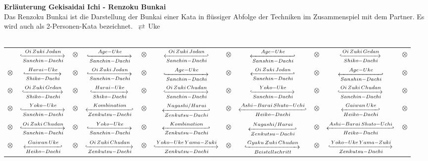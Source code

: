 		{\textbf{Erläuterung Gekisaidai Ichi - Renzoku Bunkai}}\\
		Das Renzoku Bunkai ist die Darstellung der Bunkai einer Kata in flüssiger Abfolge der Techniken im Zusammenspiel mit dem Partner. Es wird auch als 2-Personen-Kata bezeichnet. \,\(\rightleftarrows\)\,{\color{Blue}Uke}\\\\
\setlength{\tabcolsep}{1pt}
\begin{tabular}{*{11}{c}}
	&{\color{GKD}$\xhookrightarrow[Sanchin-Dachi]{Oi\,Zuki\,Jodan}$}
	&$\otimes$
	&{\color{Blue}$\xhookrightarrow[Sanchin-Dachi]{Age-Uke}$}
	&$\otimes$
	&{\color{Blue}$\xhookleftarrow[Sanchin-Dachi]{Oi\,Zuki\,Jodan}$}
	&$\otimes$
	&{\color{GKD}$\xhookleftarrow[Sanshin-Dachi]{Age-Uke}$}
	&$\otimes$
	&{\color{GKD}$\xhookrightarrow[Shiko-Dachi]{Oi\,Zuki\,Gedan}$}
	&$\otimes$\\
	\addlinespace[8pt]
	$\otimes$
	&{\color{Blue}$\xhookrightarrow[Shiko-Dachi]{Harai-Uke}$}
	&$\otimes$
	&{\color{GKD}$\xhookrightarrow[Sanchin-Dachi]{Oi\,Zuki\,Jodan}$}
	&$\otimes$
	&{\color{Blue}$\xhookrightarrow[Sanchin-Dachi]{Age-Uke}$}
	&$\otimes$
	&{\color{Blue}$\xhookleftarrow[Sanchin-Dachi]{Oi\,Zuki\,Jodan}$}
	&$\otimes$
	&{\color{GKD}$\xhookleftarrow[Sanshin-Dachi]{Age-Uke}$}
	&$\otimes$\\
	\addlinespace[8pt]
	$\otimes$
	&{\color{GKD}$\xhookrightarrow[Shiko-Dachi]{Oi\,Zuki\,Gedan}$}
	&$\otimes$
	&{\color{Blue}$\xhookrightarrow[Shiko-Dachi]{Harai-Uke}$}
	&$\otimes$
	&{\color{GKD}$\xhookrightarrow[Sanchin-Dachi]{Oi\,Zuki\,Chudan}$}
	&$\otimes$
	&{\color{Blue}$\xhookrightarrow[Sanchin-Dachi]{Yoko-Uke}$}
	&$\otimes$
	&{\color{GKD}$\xhookrightarrow[Sanchin-Dachi]{Oi\,Zuki\,Chudan}$}
	&$\otimes$\\
	\addlinespace[8pt]
	$\otimes$
	&{\color{Blue}$\xhookrightarrow[Sanchin-Dachi]{Yoko-Uke}$}
	&$\otimes$
	&{\color{Blue}$\xhookleftarrow[Zenkutsu-Dachi]{Kombination}$}
	&$\otimes$
	&{\color{GKD}$\xhookleftarrow[Zenkutsu-Dachi]{Nagashi/Harai}$}
	&$\otimes$
	&{\color{Blue}$\xhookleftarrow[Heiko-Dachi]{Ashi-Barai\,Shuto-Uchi}$}
	&$\otimes$
	&{\color{GKD}$\xhookleftarrow[Heiko-Dachi]{Gaiwan\,Uke}$}
	&$\otimes$\\
	\addlinespace[8pt]
	$\otimes$
	&{\color{GKD}$\xhookrightarrow[Sanchin-Dachi]{Oi\,Zuki\,Chudan}$}
	&$\otimes$
	&{\color{Blue}$\xhookrightarrow[Sanchin-Dachi]{Yoko-Uke}$}
	&$\otimes$
	&{\color{Blue}$\xhookleftarrow[Zenkutsu-Dachi]{Kombination}$}
	&$\otimes$
	&{\color{GKD}$\xhookleftarrow[Zenkutsu-Dachi]{Nagashi/Harai}$}
	&$\otimes$
	&{\color{Blue}$\xhookleftarrow[Heiko-Dachi]{Ashi-Barai\,Shuto-Uchi}$}
	&$\otimes$\\
	\addlinespace[8pt]
	$\otimes$
	&{\color{GKD}$\xhookleftarrow[Heiko-Dachi]{Gaiwan\,Uke}$}
	&$\otimes$
	&{\color{GKD}$\xhookrightarrow[Zenkutsu-Dachi]{Oi\,Zuki\,Chudan}$}
	&$\otimes$
	&{\color{Blue}$\xhookrightarrow[Zenkutsu-Dachi]{Yoko-Uke\,Yama-Zuki}$}
	&$\otimes$
	&{\color{GKD}$\xhookrightarrow[Beistellschritt]{Gyaku\,Zuki\,Chudan}$}
	&$\otimes$
	&{\color{Blue}$\xhookrightarrow[Zenkutsu-Dachi]{Yoko-Uke\,Yama-Zuki}$}
\end{tabular}
\setlength{\tabcolsep}{6pt}
\renewcommand{\arraystretch}{1}





